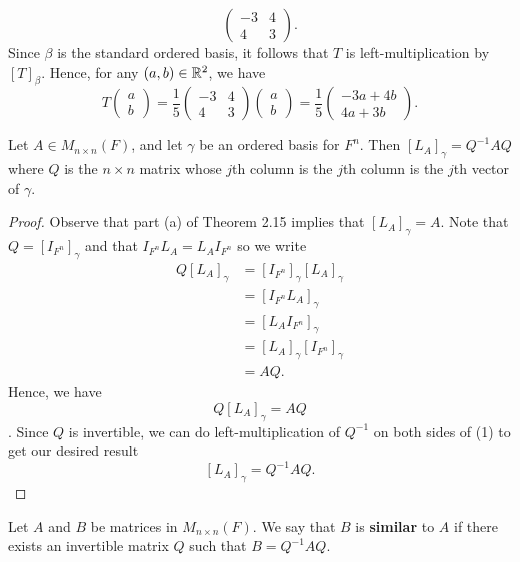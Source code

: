 \begin{eg}
\[\begin{pmatrix}
    -3 & 4 \\
    4 & 3 
\end{pmatrix}. \]
Since \( \beta \) is the standard ordered basis, it follows that \( T  \) is left-multiplication by \( [T]_{\beta}  \). Hence, for any \( (a,b) \in \mathbb{R}^{2} \), we have
\[ T \begin{pmatrix}
    a \\
    b
\end{pmatrix} = \frac{ 1 }{ 5 }  \begin{pmatrix}
-3 & 4 \\
4 & 3 
\end{pmatrix} \begin{pmatrix}
    a \\
    b 
\end{pmatrix} = \frac{ 1 }{ 5 }  \begin{pmatrix}
    -3a + 4b \\
    4a + 3b
\end{pmatrix}.  \]

\end{eg}
\begin{corollary}
   Let \( A \in {M}_{n \times n}(F) \), and let \( \gamma  \) be an ordered basis for \( F^{n}  \). Then \( [{L}_{A}]_{\gamma} = Q^{-1} A Q \) where \( Q  \) is the \( n \times n  \) matrix whose \( j \)th column is the \( j \)th column is the \( j \)th vector of \( \gamma \).
\end{corollary} 
\begin{proof}
Observe that part (a) of Theorem 2.15 implies that \( [{L}_{A}]_{\gamma} = A  \). Note that \( Q = [{I}_{F^{n}}]_{\gamma} \) and that \( {I}_{F^{n}}{L}_{A} = {L}_{A} {I}_{F^{n}}  \) so we write
\begin{align*}
    Q [{L}_{A}]_{\gamma} &= [{I}_{F^{n}}]_{\gamma} [{L}_{A}]_{\gamma}  \\
                         &= [{I}_{F^{n}} {L}_{A}]_{ \gamma} \\
                         &=  [{L}_{A} {I}_{F^{n}}]_{\gamma} \\
                         &=  [{L}_{A}]_{\gamma} [{I}_{F^{n}}]_{\gamma} \\
                         &= AQ.
\end{align*} 
Hence, we have \[ Q [{L}_{A}]_{\gamma} = AQ \tag{1} \]. Since \( Q  \) is invertible, we can do left-multiplication of \( Q^{-1} \) on both sides of (1) to get our desired result
\[  [{L}_{A}]_{\gamma} = Q^{-1} A Q. \]
\end{proof}


\begin{definition}
    Let \( A  \) and \( B  \) be matrices in \( {M}_{n \times n }(F)  \). We say that \( B  \) is \textbf{similar} to \( A  \) if there exists an invertible matrix \( Q  \) such that \( B = Q^{-1}A Q  \). 
\end{definition}

